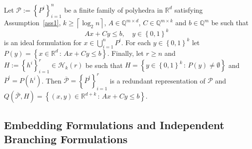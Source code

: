 \documentclass[mnsc]{informs3}
\newcommand{\set}[1]{\left\{#1\right\}}                     %
\newcommand{\bra}[1]{\left(#1\right)}
\newcommand{\Real}{\mathbb R}
\begin{document}
\begin{proposition}\label{idealeqembeddingprop}Let $\mathcal{P}:=\set{P^i}_{i=1}^n$ be a finite family of polyhedra in $\Real^d$ satisfying Assumption~\ref{ass1}, $k\geq \left\lceil \log_2 n\right\rceil$, $A\in \mathbb{Q}^{m\times d}$, $C\in \mathbb{Q}^{m\times k}$ and $b\in \mathbb{Q}^{m}$ be such that 
\begin{equation}
Ax+Cy\leq b,\quad y\in \set{0,1}^k
\end{equation}
is an ideal formulation for $x\in \bigcup_{i=1}^n P^i$. For each $y\in \set{0,1}^k$ let $P\bra{y}=\set{x\in \Real^d\,:\, Ax+Cy\leq b}$. Finally, let $r\geq n$ and $H:=\set{h^i}_{i=1}^r\in \mathcal{H}_k(r)$ be such that $H=\set{y\in \set{0,1}^k\,:\, P\bra{y} \neq \emptyset}$ and $\overline{P}^i=P\bra{h^i}$. Then  $\overline{\mathcal{P}}=\set{\overline{P}^i}_{i=1}^r$ is a redundant representation of $\mathcal{P}$ and
$Q\bra{\overline{\mathcal{P}},H}=\set{\bra{x,y}\in \mathbb{R}^{d+k}\,:\, Ax+Cy\leq b}$.
\end{proposition} 

\subsection{Embedding Formulations and Independent Branching Formulations}\label{indepandredundsec}
\end{document}
